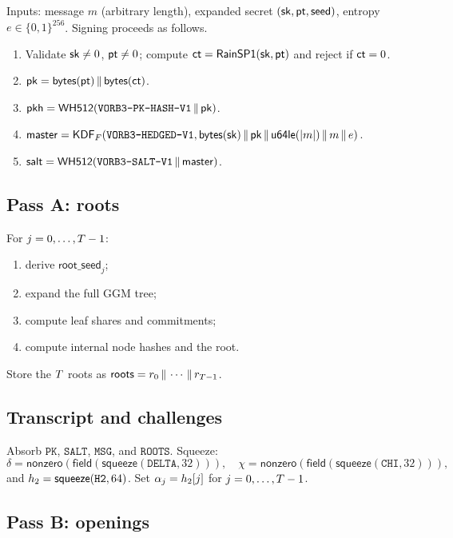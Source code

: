 \documentclass[11pt,a4paper]{article}
\begin{document}
Inputs: message $m$ (arbitrary length), expanded secret
$(\mathsf{sk},\mathsf{pt},\mathsf{seed})$, entropy $e\in\{0,1\}^{256}$. Signing proceeds as
follows.

\begin{enumerate}
  \item Validate $\mathsf{sk}\ne0$, $\mathsf{pt}\ne0$; compute $\mathsf{ct}=\mathsf{RainSP1}(\mathsf{sk},\mathsf{pt})$ and reject
        if $\mathsf{ct}=0$.
  \item $\mathsf{pk}=\mathsf{bytes}(\mathsf{pt})\,\|\,\mathsf{bytes}(\mathsf{ct})$.
  \item $\mathsf{pkh}=\mathsf{WH512}(\texttt{VORB3-PK-HASH-V1}\,\|\,\mathsf{pk})$.
  \item $\mathsf{master}=\mathsf{KDF}_F(\texttt{VORB3-HEDGED-V1},
        \mathsf{bytes}(\mathsf{sk})\,\|\,\mathsf{pk}\,\|\,\mathsf{u64le}(|m|)\,\|\, m\,\|\, e)$.
  \item $\mathsf{salt}=\mathsf{WH512}(\texttt{VORB3-SALT-V1}\,\|\,\mathsf{master})$.
\end{enumerate}

\subsection{Pass A: roots}

For $j=0,\ldots,T-1$:
\begin{enumerate}
  \item derive $\mathsf{root\_seed}_j$;
  \item expand the full GGM tree;
  \item compute leaf shares and commitments;
  \item compute internal node hashes and the root.
\end{enumerate}
Store the $T$ roots as $\mathsf{roots}=r_0\,\|\,\cdots\,\|\, r_{T-1}$.

\subsection{Transcript and challenges}

Absorb $\texttt{PK}$, $\texttt{SALT}$, $\texttt{MSG}$, and $\texttt{ROOTS}$.
Squeeze:
\[
\delta=\mathsf{nonzero}(\mathsf{field}(\mathsf{squeeze}(\texttt{DELTA},32))),
\quad
\chi=\mathsf{nonzero}(\mathsf{field}(\mathsf{squeeze}(\texttt{CHI},32))),
\]
and $h_2=\mathsf{squeeze}(\texttt{H2},64)$. Set
$\alpha_j=h_2[j]$ for $j=0,\ldots,T-1$.

\subsection{Pass B: openings}
\end{document}
